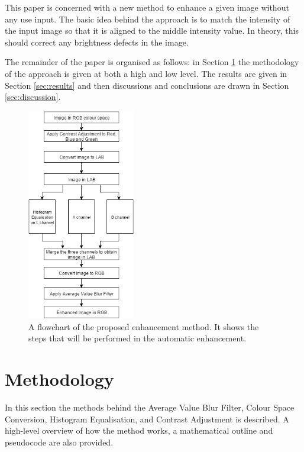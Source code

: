 \documentclass[journal,transmag]{IEEEtran}
\begin{document}
This paper is concerned with a new method to enhance a given image without any use input.  The basic idea behind the approach is to match the intensity of the input image so that it is aligned to the middle intensity value.  In theory, this should correct any brightness defects in the image.

The remainder of the paper is organised as follows: in Section \ref{sec:methods} the methodology of the approach is given at both a high and low level.  The results are given in Section \ref{sec:results} and then discussions and conclusions are drawn in Section \ref{sec:discussion}.

\begin{figure}[h!]
\centering
\includegraphics[width=0.42\textwidth]{figures/flowchart.png}
\caption{A flowchart of the proposed enhancement method. It shows the steps that will be performed in the automatic enhancement.}
\label{fig:flowchart}
\end{figure}

\section{Methodology}
\label{sec:methods}

In this section the methods behind the Average Value Blur Filter, Colour Space Conversion, Histogram Equalisation, and Contrast Adjustment is described. A high-level overview of how the method works, a mathematical outline and pseudocode are also provided.
\end{document}
